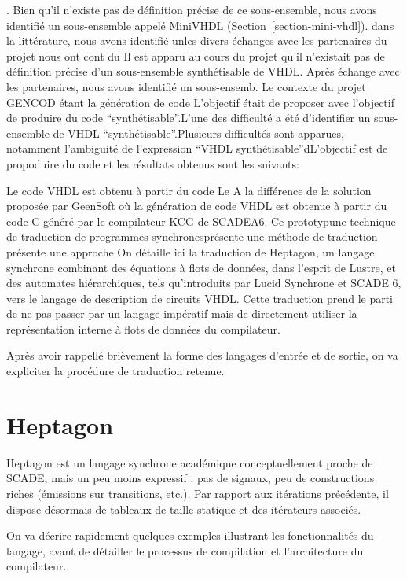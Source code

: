 \documentclass[a4paper]{article}
\newcommand{\LANG}{Heptagon}
\begin{document}
. Bien qu'il n'existe
pas de d\'efinition pr\'ecise de ce sous-ensemble, nous avons identifi\'e un sous-ensemble
appel\'e MiniVHDL (Section~\ref{section-mini-vhdl}).  dans la litt\'erature, nous
avons identifi\'e unles divers \'echanges
avec les partenaires du projet nous ont cont du Il est apparu au cours du projet qu'il
n'existait pas de d\'efinition pr\'ecise d'un sous-ensemble synth\'etisable
de VHDL. Apr\`es \'echange avec les partenaires, nous avons identifi\'e un
sous-ensemb. Le contexte du projet GENCOD \'etant la g\'en\'eration de code
L'objectif \'etait de proposer avec l'objectif de produire du code
``synth\'etisable''.L'une des difficult\'e a \'et\'e d'identifier un
sous-ensemble de VHDL ``synth\'etisable''.Plusieurs difficult\'es sont
apparues, notamment l'ambiguit\'e de l'expression ``VHDL
synth\'etisable''dL'objectif est de propoduire du code et les r\'esultats
obtenus sont les suivants:

Le code VHDL est obtenu \`a partir du code Le A la diff\'erence de la solution propos\'ee par GeenSoft o\`u la g\'en\'eration de
code VHDL est obtenue \`a partir du code C g\'en\'er\'e par le compilateur KCG de
SCADEA6. Ce prototypune technique de traduction de programmes synchronespr\'esente une m\'ethode de traduction pr\'esente une approche 
On d\'etaille ici la traduction de \LANG{}, un langage synchrone combinant des
\'equations \`a flots de donn\'ees, dans l'esprit de Lustre, et des automates
hi\'erarchiques, tels qu'introduits par Lucid Synchrone et SCADE 6, vers le
langage de description de circuits VHDL. Cette traduction prend le parti de ne
pas passer par un langage imp\'eratif mais de directement utiliser la
repr\'esentation interne \`a flots de donn\'ees du compilateur.

Apr\`es avoir rappell\'e bri\`evement la forme des langages d'entr\'ee et de sortie, on
va expliciter la proc\'edure de traduction retenue.

\section{\LANG}

\LANG{} est un langage synchrone acad\'emique conceptuellement proche de SCADE,
mais un peu moins expressif : pas de signaux, peu de constructions riches
(\'emissions sur transitions, etc.). Par rapport aux it\'erations pr\'ec\'edente, il
dispose d\'esormais de tableaux de taille statique et des it\'erateurs associ\'es.

On va d\'ecrire rapidement quelques exemples illustrant les fonctionnalit\'es du
langage, avant de d\'etailler le processus de compilation et l'architecture du
compilateur.
\end{document}
